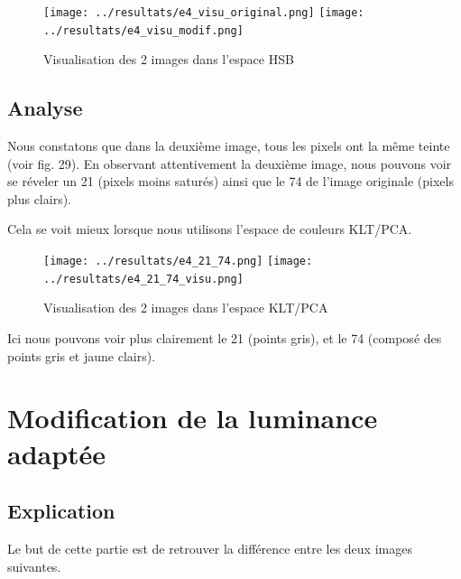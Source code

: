 \documentclass[a4paper]{article}
\begin{document}
\begin{figure}[H]
\begin{center}
\texttt{[image: ../resultats/e4\_visu\_original.png]}
\texttt{[image: ../resultats/e4\_visu\_modif.png]}
\end{center}
\caption{Visualisation des 2 images dans l'espace HSB}
\end{figure}

\clearpage
\subsection{Analyse}

Nous constatons que dans la deuxième image, tous les pixels ont la même teinte (voir fig. 29).
En observant attentivement la deuxième image, nous pouvons voir se réveler un 21 (pixels moins saturés) ainsi que le 74 de l'image originale (pixels plus clairs).

Cela se voit mieux lorsque nous utilisons l'espace de couleurs KLT/PCA.

\begin{figure}[H]
\begin{center}
\texttt{[image: ../resultats/e4\_21\_74.png]}
\texttt{[image: ../resultats/e4\_21\_74\_visu.png]}
\end{center}
\caption{Visualisation des 2 images dans l'espace KLT/PCA}
\end{figure}

Ici nous pouvons voir plus clairement le 21 (points gris), et le 74 (composé des points gris et jaune clairs).

\clearpage

\section{Modification de la luminance adaptée}

\subsection{Explication}

Le but de cette partie est de retrouver la différence entre les deux images suivantes.
\end{document}
